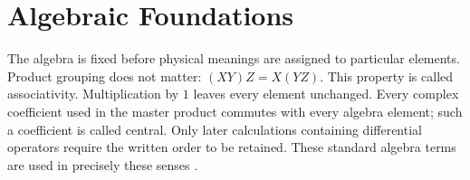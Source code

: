 \documentclass[10pt,letterpaper]{article}
\newcommand{\pv}[1]{#1}
\begin{document}
\section{Algebraic Foundations}\label{sec:algebra}\label{sec:foundations}\label{sec:functions}
The algebra is fixed before physical meanings are assigned to particular
elements. Product grouping does not matter:
\((\pv{X}\pv{Y})\pv{Z}=\pv{X}(\pv{Y}\pv{Z})\). This property is called
associativity. Multiplication by \(1\) leaves every element unchanged. Every
complex coefficient used in the master product commutes with every algebra
element; such a coefficient is called central. Only later calculations
containing differential operators require the written order to be retained.
These standard algebra terms are used in precisely these senses
\cite{hestenes1966,doran2003}.
\end{document}
